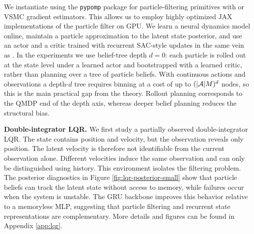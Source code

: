 We instantiate  using the \texttt{pypomp} \citep{pypomp2024github} package for particle-filtering primitives
with  or VSMC \citep{naesseth18} gradient estimators. This allows us to employ highly optimized JAX implementations of the particle filter on GPU. We learn a neural dynamics
model online, maintain a particle approximation to the latent state posterior,
and use an actor and a critic trained with recurrent SAC-style updates \citep{ni2021recurrentbaseline} in the same vein as \cite{han2026neuralodesdemodels}.  In the experiments we use belief-tree depth $d=0$: each particle is rolled out at the state level under a learned actor and bootstrapped with a learned critic, rather than planning over a tree of particle beliefs.
With continuous actions and observations a depth-$d$ tree requires binning at a cost of up to $(|{\mathcal{A}}|M)^d$ nodes, so this is the main practical gap from the theory.
Rollout planning corresponds to the QMDP end of the depth axis, whereas deeper belief planning reduces the structural bias.




\textbf{Double-integrator LQR.} We first study a partially observed double-integrator LQR.  The state contains
position and velocity, but the observation reveals only position. The
latent velocity is therefore not identifiable from the current observation alone. Different
velocities induce the same observation and can only be distinguished using
history.  This environment isolates the filtering problem.  The posterior
diagnostics in Figure \ref{fig:lqr-posterior-small} show that particle beliefs can track the latent state without access to memory, while failures occur when the system is unstable.
The GRU backbone improves this behavior relative to a memoryless MLP, suggesting that particle filtering and recurrent state representations are
complementary. More details and figures can be found in Appendix \ref{app:lqr}.

